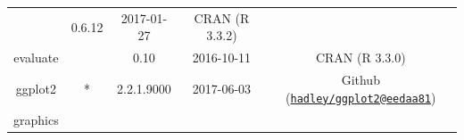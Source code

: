 \documentclass[]{article}
\begin{document}
\begin{itemize}
\begin{longtable}[]{@{}ccccc@{}}
\begin{minipage}[t]{0.05\columnwidth}
  \strut
  \end{minipage} & \begin{minipage}[t]{0.13\columnwidth}\centering\strut
  0.6.12\strut
  \end{minipage} & \begin{minipage}[t]{0.13\columnwidth}\centering\strut
  2017-01-27\strut
  \end{minipage} & \begin{minipage}[t]{0.29\columnwidth}\centering\strut
  CRAN (R 3.3.2)\strut
  \end{minipage}\tabularnewline
  \begin{minipage}[t]{0.13\columnwidth}\centering\strut
  evaluate\strut
  \end{minipage} & \begin{minipage}[t]{0.05\columnwidth}\centering\strut
  \strut
  \end{minipage} & \begin{minipage}[t]{0.13\columnwidth}\centering\strut
  0.10\strut
  \end{minipage} & \begin{minipage}[t]{0.13\columnwidth}\centering\strut
  2016-10-11\strut
  \end{minipage} & \begin{minipage}[t]{0.29\columnwidth}\centering\strut
  CRAN (R 3.3.0)\strut
  \end{minipage}\tabularnewline
  \begin{minipage}[t]{0.13\columnwidth}\centering\strut
  ggplot2\strut
  \end{minipage} & \begin{minipage}[t]{0.05\columnwidth}\centering\strut
  *\strut
  \end{minipage} & \begin{minipage}[t]{0.13\columnwidth}\centering\strut
  2.2.1.9000\strut
  \end{minipage} & \begin{minipage}[t]{0.13\columnwidth}\centering\strut
  2017-06-03\strut
  \end{minipage} & \begin{minipage}[t]{0.29\columnwidth}\centering\strut
  Github
  (\href{mailto:hadley/ggplot2@eedaa81}{\nolinkurl{hadley/ggplot2@eedaa81}})\strut
  \end{minipage}\tabularnewline
  \begin{minipage}[t]{0.13\columnwidth}\centering\strut
  graphics\strut
  \end{minipage} & \begin{minipage}[t]{0.05\columnwidth}\centering\strut

\end{minipage}
\end{longtable}
\end{itemize}
\end{document}
